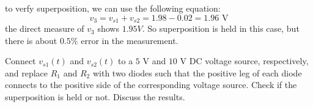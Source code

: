 \documentclass[11pt]{article}
\begin{document}
\begin{question}
\begin{subquestion}
{            to verfy superposition, we can use the following equation:
            \begin{equation*}
                v_3 = v_{s1} + v_{s2} = 1.98 - 0.02 = 1.96 \text{ V}
            \end{equation*}
            the direct measure of $v_3$ shows $1.95 V$. So superposition is held in this case, but
            there is about $0.5\%$ error in the measurement.
        }


    \end{subquestion}

    \begin{subquestion}{Connect $v_{s1}(t)$ and $v_{s2}(t)$ to a $5$ V and $10$ V DC voltage source, respectively, and replace $R_1$ and $R_2$ with two diodes such that the positive leg of each diode connects to the positive side of the corresponding voltage source. Check if the superposition is held or not. Discuss the results.}
\end{subquestion}
\end{question}
\end{document}
